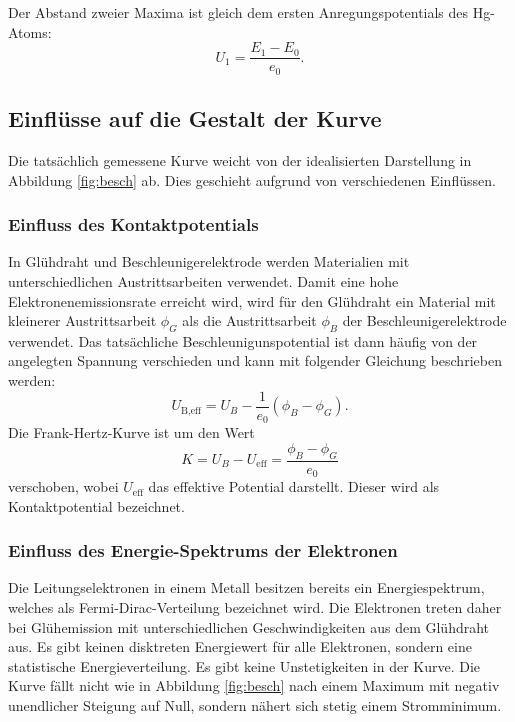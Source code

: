 \noindent Der Abstand zweier Maxima ist gleich dem ersten Anregungspotentials des Hg-Atoms:
\begin{equation}
  \label{eq:pot}
  U_1 = \frac{E_1 - E_0}{e_0}  .
\end{equation}
 \subsection{Einflüsse auf die Gestalt der Kurve}
Die tatsächlich gemessene Kurve weicht von der idealisierten Darstellung in Abbildung \ref{fig:besch} ab.
Dies geschieht aufgrund von verschiedenen Einflüssen.
\subsubsection{Einfluss des Kontaktpotentials}
In Glühdraht und Beschleunigerelektrode werden Materialien mit unterschiedlichen Austrittsarbeiten verwendet.
Damit eine hohe Elektronenemissionsrate erreicht wird, wird für den Glühdraht ein Material mit kleinerer Austrittsarbeit $\phi_G$ als die Austrittsarbeit $\phi_B$ der Beschleunigerelektrode verwendet.
Das tatsächliche Beschleunigunspotential ist dann häufig von der angelegten Spannung verschieden und kann mit folgender Gleichung beschrieben werden:
\begin{equation}
  U_\text{B,eff}= U_B-\frac{1}{e_0}(\phi_B -\phi_G) .
\end{equation}
Die Frank-Hertz-Kurve ist um den Wert
\begin{equation}
  \label{eq:k}
  K = U_B - U_\text{eff} = \frac{\phi_B - \phi_G}{e_0}
\end{equation}
verschoben, wobei $U_\text{eff}$ das effektive Potential darstellt.
Dieser wird als Kontaktpotential bezeichnet.
\subsubsection{Einfluss des Energie-Spektrums der Elektronen}
Die Leitungselektronen in einem Metall besitzen bereits ein Energiespektrum, welches als Fermi-Dirac-Verteilung bezeichnet wird.
Die Elektronen treten daher bei Glühemission mit unterschiedlichen Geschwindigkeiten aus dem Glühdraht aus.
Es gibt keinen disktreten Energiewert für alle Elektronen, sondern eine statistische Energieverteilung.
Es gibt keine Unstetigkeiten in der Kurve.
Die Kurve fällt nicht wie in Abbildung \ref{fig:besch} nach einem Maximum mit negativ unendlicher Steigung auf Null, sondern nähert sich stetig einem Stromminimum.
